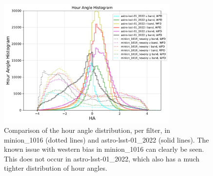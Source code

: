 \documentclass[DM,lsstdraft,authoryear,toc]{lsstdoc}
\begin{document}
\begin{figure}[ht]
\centering
\includegraphics[width=0.8\textwidth]{figures/hour_angle_comparison}
\caption{Comparison of the hour angle distribution, per filter, in minion\_1016 (dotted lines) and astro-lsst-01\_2022 (solid lines). The known issue with western bias in minion\_1016 can clearly be seen. This does not occur in astro-lsst-01\_2022, which also has a much tighter distribution of hour angles.
\label{fig:hour_angle_comparison}}
\end{figure}
\end{document}
